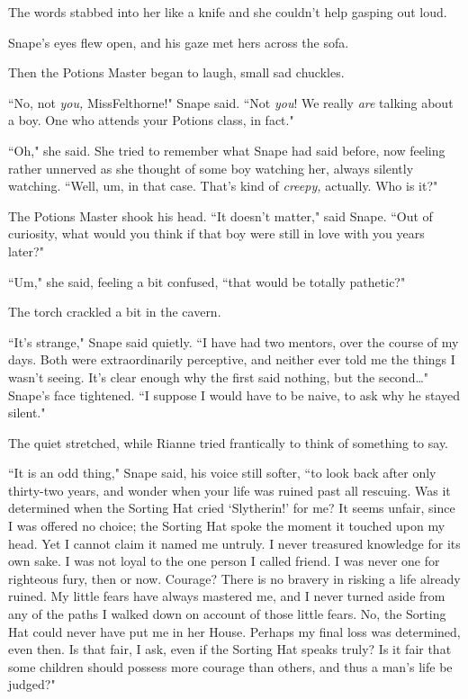 The words stabbed into her like a knife and she couldn't help gasping out loud.

Snape's eyes flew open, and his gaze met hers across the sofa.

Then the Potions Master began to laugh, small sad chuckles.

``No, not \emph{you,} Miss\?Felthorne!" Snape said. ``Not \emph{you}! We really \emph{are} talking about a boy. One who attends your Potions class, in fact."

``Oh," she said. She tried to remember what Snape had said before, now feeling rather unnerved as she thought of some boy watching her, always silently watching. ``Well, um, in that case. That's kind of \emph{creepy,} actually. Who is it?"

The Potions Master shook his head. ``It doesn't matter," said Snape. ``Out of curiosity, what would you think if that boy were still in love with you years later?"

``Um," she said, feeling a bit confused, ``that would be totally pathetic?"

The torch crackled a bit in the cavern.

``It's strange," Snape said quietly. ``I have had two mentors, over the course of my days. Both were extraordinarily perceptive, and neither ever told me the things I wasn't seeing. It's clear enough why the first said nothing, but the second{\ldots}" Snape's face tightened. ``I suppose I would have to be naive, to ask why he stayed silent."

The quiet stretched, while Rianne tried frantically to think of something to say.

``It is an odd thing," Snape said, his voice still softer, ``to look back after only thirty-two years, and wonder when your life was ruined past all rescuing. Was it determined when the Sorting Hat cried `Slytherin!' for me? It seems unfair, since I was offered no choice; the Sorting Hat spoke the moment it touched upon my head. Yet I cannot claim it named me untruly. I never treasured knowledge for its own sake. I was not loyal to the one person I called friend. I was never one for righteous fury, then or now. Courage? There is no bravery in risking a life already ruined. My little fears have always mastered me, and I never turned aside from any of the paths I walked down on account of those little fears. No, the Sorting Hat could never have put me in her House. Perhaps my final loss was determined, even then. Is that fair, I ask, even if the Sorting Hat speaks truly? Is it fair that some children should possess more courage than others, and thus a man's life be judged?"

